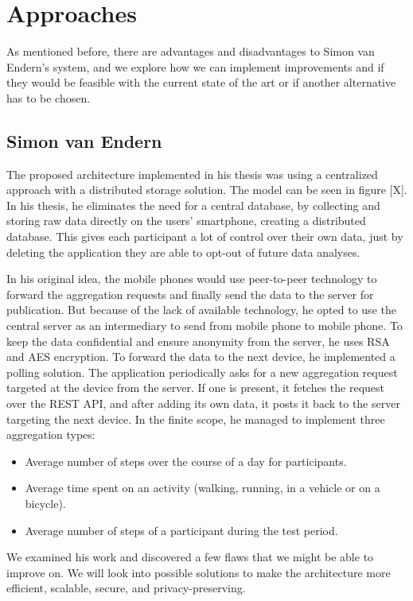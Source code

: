 \section{Approaches}
As mentioned before, there are advantages and disadvantages to Simon van Endern's system, and we explore how we can implement improvements and if they would be feasible with the current state of the art or if another alternative has to be chosen.

\subsection{Simon van Endern}
The proposed architecture implemented in his thesis was using a centralized approach with a distributed storage solution. The model can be seen in figure [X].
In his thesis, he eliminates the need for a central database, by collecting and storing raw data directly on the users' smartphone, creating a distributed database. This gives each participant a lot of control over their own data, just by deleting the application they are able to opt-out of future data analyses.

In his original idea, the mobile phones would use peer-to-peer technology to forward the aggregation requests and finally send the data to the server for publication. But because of the lack of available technology, he opted to use the central server as an intermediary to send from mobile phone to mobile phone. To keep the data confidential and ensure anonymity from the server, he uses RSA and AES encryption. To forward the data to the next device, he implemented a polling solution. The application periodically asks for a new aggregation request targeted at the device from the server. If one is present, it fetches the request over the REST API, and after adding its own data, it posts it back to the server targeting the next device.
In the finite scope, he managed to implement three aggregation types:

\begin{itemize}
    \item Average number of steps over the course of a day for participants. 
    \item Average time spent on an activity (walking, running, in a vehicle or on a bicycle).
    \item Average number of steps of a participant during the test period. 
\end{itemize}

We examined his work and discovered a few flaws that we might be able to improve on. We will look into possible solutions to make the architecture more efficient, scalable, secure, and privacy-preserving. 


